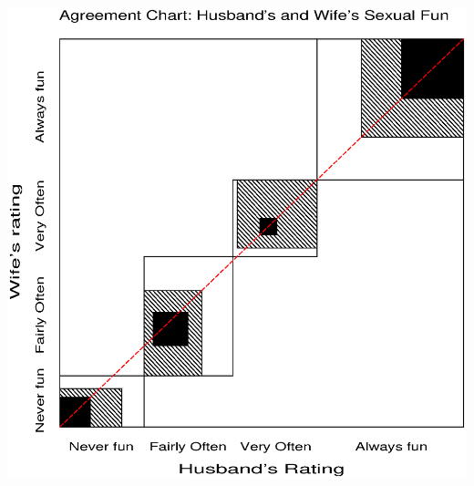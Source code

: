 \begin{center}
\begin{minipage}[c]{.33\linewidth}
 \end{minipage}
 \hfill
 \begin{minipage}[c]{.33\linewidth}
  \includegraphics[width=1\linewidth,clip]{ch3/fig/agree12}
 \end{minipage}
\end{center}

